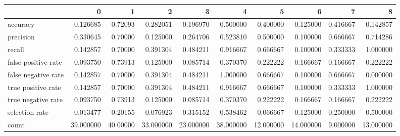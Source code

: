 \begin{tabular}{lrrrrrrrrr}
\toprule
{} &          0 &         1 &          2 &          3 &          4 &          5 &          6 &         7 &          8 \\
\midrule
accuracy            &   0.126685 &   0.72093 &   0.282051 &   0.196970 &   0.500000 &   0.400000 &   0.125000 &  0.416667 &   0.142857 \\
precision           &   0.330645 &   0.70000 &   0.125000 &   0.264706 &   0.523810 &   0.500000 &   0.100000 &  0.666667 &   0.714286 \\
recall              &   0.142857 &   0.70000 &   0.391304 &   0.484211 &   0.916667 &   0.666667 &   0.100000 &  0.333333 &   1.000000 \\
false positive rate &   0.093750 &   0.73913 &   0.125000 &   0.085714 &   0.370370 &   0.222222 &   0.166667 &  0.166667 &   0.222222 \\
false negative rate &   0.142857 &   0.70000 &   0.391304 &   0.484211 &   1.000000 &   0.666667 &   0.100000 &  0.666667 &   0.000000 \\
true positive rate  &   0.142857 &   0.70000 &   0.391304 &   0.484211 &   0.916667 &   0.666667 &   0.100000 &  0.333333 &   1.000000 \\
true negative rate  &   0.093750 &   0.73913 &   0.125000 &   0.085714 &   0.370370 &   0.222222 &   0.166667 &  0.166667 &   0.222222 \\
selection rate      &   0.013477 &   0.20155 &   0.076923 &   0.315152 &   0.538462 &   0.066667 &   0.125000 &  0.250000 &   0.500000 \\
count               &  39.000000 &  40.00000 &  33.000000 &  23.000000 &  38.000000 &  12.000000 &  14.000000 &  9.000000 &  13.000000 \\
\bottomrule
\end{tabular}
